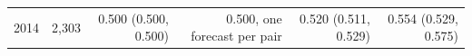 \begin{tabular}{lrrrrr}
2014 & 2,303 & 0.500 (0.500, 0.500) & 0.500, one forecast per pair & 0.520 (0.511, 0.529) & 0.554 (0.529, 0.575) \\

\end{tabular}
